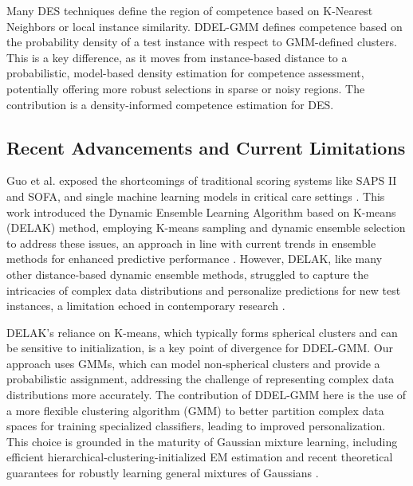 \documentclass[lettersize,journal]{IEEEtran}
\newcommand{\greenhighlight}[1]{\textcolor{highlightgreen}{#1}}
\begin{document}
\greenhighlight{Many DES techniques define the region of competence based on K-Nearest Neighbors or local instance similarity. DDEL-GMM defines competence based on the probability density of a test instance with respect to GMM-defined clusters. This is a key difference, as it moves from instance-based distance to a probabilistic, model-based density estimation for competence assessment, potentially offering more robust selections in sparse or noisy regions. The contribution is a density-informed competence estimation for DES.}

\subsection{Recent Advancements and Current Limitations}
\noindent Guo et al. \cite{guo_dynamic_2021} exposed the shortcomings of traditional scoring systems like SAPS II and SOFA, and single machine learning models in critical care settings \cite{juraev_multilayer_2022, sagi_ensemble_2018}. This work introduced the Dynamic Ensemble Learning Algorithm based on K-means (DELAK) method, employing K-means sampling and dynamic ensemble selection to address these issues, an approach in line with current trends in ensemble methods for enhanced predictive performance \cite{dong_survey_2020, jiang_clustering-based_2019}. However, DELAK, like many other distance-based dynamic ensemble methods, struggled to capture the intricacies of complex data distributions and personalize predictions for new test instances, a limitation echoed in contemporary research \cite{mienye_survey_2022, gonzalez_practical_2020}. 

\greenhighlight{DELAK's reliance on K-means, which typically forms spherical clusters and can be sensitive to initialization, is a key point of divergence for DDEL-GMM. Our approach uses GMMs, which can model non-spherical clusters and provide a probabilistic assignment, addressing the challenge of representing complex data distributions more accurately. The contribution of DDEL-GMM here is the use of a more flexible clustering algorithm (GMM) to better partition complex data spaces for training specialized classifiers, leading to improved personalization. This choice is grounded in the maturity of Gaussian mixture learning, including efficient hierarchical-clustering-initialized EM estimation \cite{li_gaussian_2018} and recent theoretical guarantees for robustly learning general mixtures of Gaussians \cite{liu_robustly_2023}.}
\end{document}
